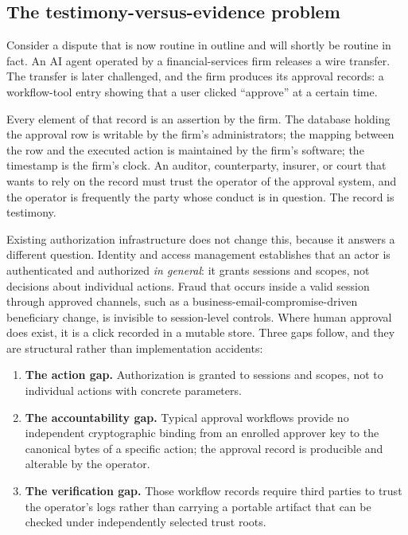 \documentclass[11pt]{article}
\begin{document}
\subsection{The testimony-versus-evidence problem}

Consider a dispute that is now routine in outline and will shortly be routine in
fact. An AI agent operated by a financial-services firm releases a wire transfer.
The transfer is later challenged, and the firm produces its approval records: a
workflow-tool entry showing that a user clicked ``approve'' at a certain time.

Every element of that record is an assertion by the firm. The database holding
the approval row is writable by the firm's administrators; the mapping between
the row and the executed action is maintained by the firm's software; the
timestamp is the firm's clock. An auditor, counterparty, insurer, or court that
wants to rely on the record must trust the operator of the approval system, and
the operator is frequently the party whose conduct is in question. The record is
testimony.

Existing authorization infrastructure does not change this, because it answers a
different question. Identity and access management establishes that an actor is
authenticated and authorized \emph{in general}: it grants sessions and scopes,
not decisions about individual actions. Fraud that occurs inside a valid session
through approved channels, such as a business-email-compromise-driven beneficiary
change, is invisible to session-level controls. Where human approval does exist,
it is a click recorded in a mutable store. Three gaps follow, and they are
structural rather than implementation accidents:

\begin{enumerate}[leftmargin=*]
\item \textbf{The action gap.} Authorization is granted to sessions and scopes,
not to individual actions with concrete parameters.
\item \textbf{The accountability gap.} Typical approval workflows provide no
independent cryptographic binding from an enrolled approver key to the canonical
bytes of a specific action; the approval record is producible and alterable by the
operator.
\item \textbf{The verification gap.} Those workflow records require third parties
to trust the operator's logs rather than carrying a portable artifact that can be
checked under independently selected trust roots.
\end{enumerate}
\end{document}
